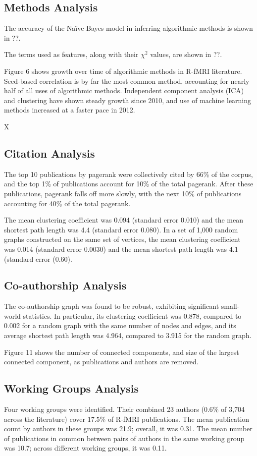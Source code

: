 \documentclass[12pt,3p,review,number]{elsarticle}
\begin{document}
\subsection{Methods Analysis}

The accuracy of the Na\"ive Bayes model in inferring
algorithmic methods is shown in ??.

The terms used as features, along with their $\chi^2$ values, are shown in
??.

Figure 6 shows growth over time of algorithmic methods in R-fMRI literature.
Seed-based correlation is by far the most common method, accounting for nearly
half of all uses of algorithmic methods. Independent component analysis (ICA)
and clustering have shown steady growth since 2010, and use of machine learning
methods increased at a faster pace in 2012.

X\subsection{Citation Analysis} 
The top 10 publications by pagerank were collectively cited by 66\% of the
corpus, and the top 1\% of publications account for 10\% of the total pagerank.
After these publications, pagerank falls off more slowly, with the next 10\% of
publications accounting for 40\% of the total pagerank. 

The mean clustering coefficient was 0.094 (standard error 0.010) and the mean
shortest path length was 4.4 (standard error 0.080). In a set of 1,000 random
graphs constructed on the same set of vertices, the mean clustering coefficient
was 0.014 (standard error 0.0030) and the mean shortest path length was 4.1
(standard error (0.60).

\subsection{Co-authorship Analysis}
The co-authorship graph was found to be robust, exhibiting significant
small-world statistics. In particular, its clustering coefficient was 0.878,
compared to 0.002 for a random graph with the same number of nodes and edges,
and its average shortest path length was 4.964, compared to 3.915 for the random
graph.

Figure 11 shows the number of connected components, and size of the largest
connected component, as publications and authors are removed.  

\subsection{Working Groups Analysis}
Four working groups were identified. Their
combined 23 authors (0.6\% of 3,704 across the literature) cover 17.5\% of R-fMRI
publications. The mean publication count by authors in these groups was 21.9;
overall, it was 0.31. The mean number of publications in common between pairs of
authors in the same working group was 10.7; across different working groups, it
was 0.11.  
\end{document}
